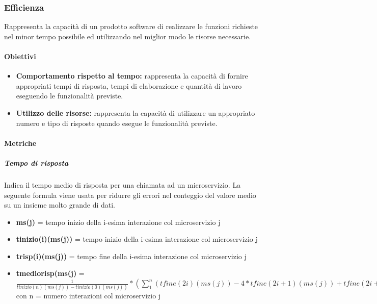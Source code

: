 			
			
			
	
	\subsubsection{Efficienza}
	Rappresenta la capacità di un prodotto software di realizzare le funzioni richieste nel minor tempo possibile ed utilizzando nel miglior modo le risorse necessarie.
		
		\paragraph{Obiettivi}
			\begin{itemize}
				\item \textbf{Comportamento rispetto al tempo:} rappresenta la capacità di fornire appropriati tempi di risposta, tempi di elaborazione e quantità di lavoro eseguendo le funzionalità previste.
				\item \textbf{Utilizzo delle risorse:} rappresenta la capacità di utilizzare un appropriato numero e tipo di risposte quando esegue le funzionalità previste.
			\end{itemize}
		
		\paragraph{Metriche}
			\subparagraph{Tempo di risposta}
			Indica il tempo medio di risposta per una chiamata ad un microservizio. La seguente formula viene usata per ridurre gli errori nel conteggio del valore medio su un insieme molto grande di dati.
			
			\begin{itemize}
				\item \textbf{ms(j)} = tempo inizio della i-esima interazione col microservizio j
				\item \textbf{tinizio(i)(ms(j))} = tempo inizio della i-esima interazione col microservizio j
				\item \textbf{trisp(i)(ms(j))} = tempo fine della i-esima interazione col microservizio j
				\item \textbf{tmediorisp(ms(j)} = \begin{math}
				\frac{1}{tinizio(n)(ms(j))-tinizio(0)(ms(j))}*(\sum_{1}^{n}(tfine(2i)(ms(j)) - 4*tfine(2i+1)(ms(j)) + tfine(2i+2)(ms(j)))) 
				\end{math} con n = numero interazioni col microservizio j
			\end{itemize}
			
